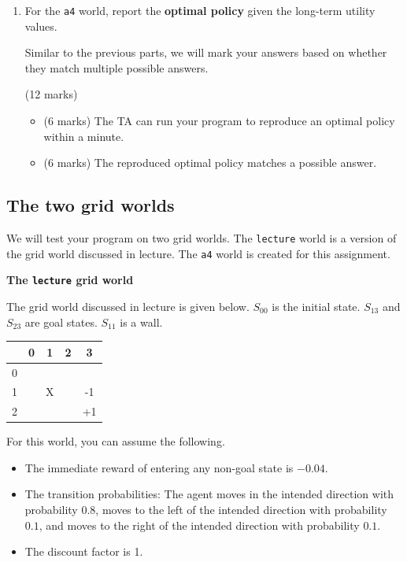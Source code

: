 \documentclass[12pt]{article}
\begin{document}
\begin{enumerate}
\item For the \verb+a4+ world, report the {\bf optimal policy} given the long-term utility values. 

Similar to the previous parts, we will mark your answers based on whether they match multiple possible answers.

\begin{markscheme}
(12 marks)

\begin{itemize}
    \item (6 marks) The TA can run your program to reproduce an optimal policy within a minute.
    \item (6 marks) The reproduced optimal policy matches a possible answer.
\end{itemize}
\end{markscheme}


\end{enumerate}

\subsection{The two grid worlds}
\label{sec:worlds}

We will test your program on two grid worlds. The \verb+lecture+ world is a version of the grid world discussed in lecture. The \verb+a4+ world is created for this assignment.

{\bf The \verb+lecture+ grid world}

The grid world discussed in lecture is given below. $S_{00}$ is the initial state. $S_{13}$ and $S_{23}$ are goal states. $S_{11}$ is a wall.
\begin{center}
\begin{tabular}{ | c | c | c | c | c |} \hline
& 0 & 1 & 2 & 3  \\ \hline
0& &     &  &  \\ \hline
1& & X &  & -1  \\ \hline
2& &     &  & +1 \\ \hline
\end{tabular}
\end{center}

For this world, you can assume the following.
\begin{itemize}
\item The immediate reward of entering any non-goal state is $-0.04$.
\item The transition probabilities:  The agent moves in the intended direction with probability $0.8$, moves to the left of the intended direction with probability $0.1$, and moves to the right of the intended direction with probability $0.1$.
\item 
The discount factor is 1.
\end{itemize}
\end{document}
